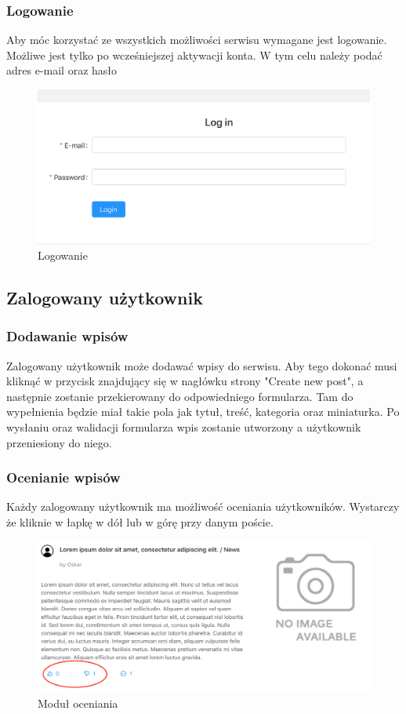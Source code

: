 \documentclass[declaration,shortabstract]{iithesis}
\begin{document}
\subsubsection{Logowanie}
Aby móc korzystać ze wszystkich możliwości serwisu wymagane jest logowanie. Możliwe jest tylko po wcześniejszej aktywacji konta. W tym celu należy podać adres e-mail oraz hasło

\begin{figure}
    \centering
    \includegraphics[width=\linewidth]{images/logowanie.png}
    \caption{Logowanie}
    \label{fig:my_label}
\end{figure}

\subsection{Zalogowany użytkownik}

\subsubsection{Dodawanie wpisów}
Zalogowany użytkownik może dodawać wpisy do serwisu. Aby tego dokonać musi kliknąć w przycisk znajdujący się w nagłówku strony "Create new post", a następnie zostanie przekierowany do odpowiedniego formularza. Tam do wypełnienia będzie miał takie pola jak tytuł, treść, kategoria oraz miniaturka. Po wysłaniu oraz walidacji formularza wpis zostanie utworzony a użytkownik przeniesiony do niego.

\subsubsection{Ocenianie wpisów}
Każdy zalogowany użytkownik ma możliwość oceniania użytkowników. Wystarczy że kliknie w łapkę w dół lub w górę przy danym poście. 
\begin{figure}
    \centering
    \includegraphics[width=\linewidth]{images/like.png}
    \caption{Moduł oceniania}
    \label{fig:my_label}
\end{figure}
\end{document}
